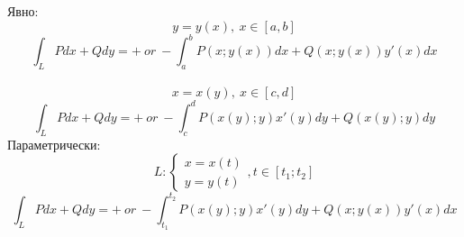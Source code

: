 \documentclass{article}
\begin{document}
Явно:
\begin{equation*}
    y= y(x),\ x\in [a,b]
\end{equation*}
\begin{equation*}
    \int_{L}^{}Pdx+Qdy = +\  or\ - \int_{a}^{b}P(x;y(x))dx+Q(x;y(x))y'(x)dx
\end{equation*}
\\
\begin{equation*}
    x= x(y),\ x\in [c,d]
\end{equation*}
\begin{equation*}
    \int_{L}^{} Pdx +Qdy = +\ or\ -\int_{c}^{d}P(x(y);y)x'(y)dy +Q(x(y);y)dy
\end{equation*}
Параметрически:
\begin{equation*}
    L: \begin{cases}
        x=x(t)\\
        y=y(t)
    \end{cases}, t\in[t_1;t_2]
\end{equation*}
\begin{equation*}
    \int_{L}^{}Pdx+Qdy = +\ or \ - \int_{t_1}^{t_2}P(x(y);y)x'(y)dy +Q(x;y(x))y'(x)dx
\end{equation*}

    
\end{document}
